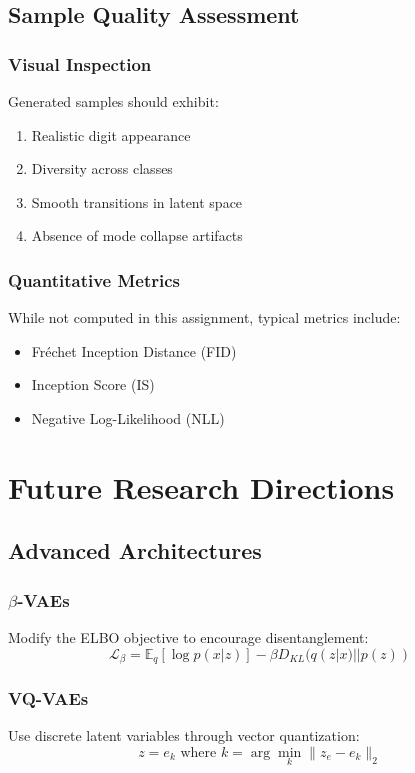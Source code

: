 \documentclass{article}
\begin{document}
\subsection{Sample Quality Assessment}

\subsubsection{Visual Inspection}
Generated samples should exhibit:
\begin{enumerate}
\item Realistic digit appearance
\item Diversity across classes
\item Smooth transitions in latent space
\item Absence of mode collapse artifacts
\end{enumerate}

\subsubsection{Quantitative Metrics}
While not computed in this assignment, typical metrics include:
\begin{itemize}
\item Fréchet Inception Distance (FID)
\item Inception Score (IS)
\item Negative Log-Likelihood (NLL)
\end{itemize}

\section{Future Research Directions}

\subsection{Advanced Architectures}

\subsubsection{$\beta$-VAEs}
Modify the ELBO objective to encourage disentanglement:
\[
\mathcal{L}_\beta = \mathbb{E}_q [\log p(x|z)] - \beta D_{KL}(q(z|x)||p(z))
\]

\subsubsection{VQ-VAEs}
Use discrete latent variables through vector quantization:
\[
z = e_k \text{ where } k = \arg\min_k \|z_e - e_k\|_2
\]
\end{document}
